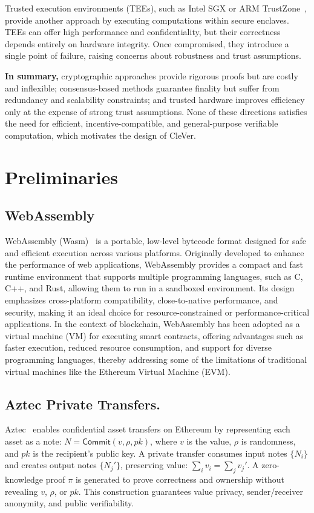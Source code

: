 \documentclass[3p]{elsarticle}
\theoremstyle{remark}
\begin{document}
Trusted execution environments (TEEs), such as Intel SGX or ARM TrustZone~\cite{SGX31,SGXICDE}, provide another approach by executing computations within secure enclaves. TEEs can offer high performance and confidentiality, but their correctness depends entirely on hardware integrity. Once compromised, they introduce a single point of failure, raising concerns about robustness and trust assumptions.

\textbf{In summary,} cryptographic approaches provide rigorous proofs but are costly and inflexible; consensus-based methods guarantee finality but suffer from redundancy and scalability constraints; and trusted hardware improves efficiency only at the expense of strong trust assumptions. None of these directions satisfies the need for efficient, incentive-compatible, and general-purpose verifiable computation, which motivates the design of CleVer.


\section{Preliminaries}


\subsection{WebAssembly}
WebAssembly (Wasm)~\cite{wasmempirical,wasmsok,wasmweb} is a portable, low-level bytecode format designed for safe and efficient execution across various platforms. Originally developed to enhance the performance of web applications, WebAssembly provides a compact and fast runtime environment that supports multiple programming languages, such as C, C++, and Rust, allowing them to run in a sandboxed environment. Its design emphasizes cross-platform compatibility, close-to-native performance, and security, making it an ideal choice for resource-constrained or performance-critical applications. In the context of blockchain, WebAssembly has been adopted as a virtual machine (VM) for executing smart contracts, offering advantages such as faster execution, reduced resource consumption, and support for diverse programming languages, thereby addressing some of the limitations of traditional virtual machines like the Ethereum Virtual Machine (EVM).

\subsection{Aztec Private Transfers.}
Aztec~\cite{aztec2021whitepaper} enables confidential asset transfers on Ethereum by representing each asset as a note: $N = \textsf{Commit}(v, \rho, pk)$, where \( v \) is the value, \( \rho \) is randomness, and \( pk \) is the recipient’s public key. A private transfer consumes input notes \( \{N_i\} \) and creates output notes \( \{N_j'\} \), preserving value: $\sum_i v_i = \sum_j v_j'$. A zero-knowledge proof \( \pi \) is generated to prove correctness and ownership without revealing \( v \), \( \rho \), or \( pk \). This construction guarantees value privacy, sender/receiver anonymity, and public verifiability.
\end{document}

